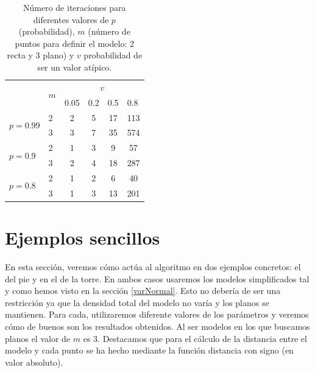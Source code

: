 \begin{table}[]
	\centering
	\begin{tabular}{l|l|c|c|c|c|}
		\cline{2-6}
		& \multirow{2}{*}{$ m $} & \multicolumn{4}{c|}{$ v $}                                                                                     \\ \cline{3-6} 
		&                    & \multicolumn{1}{l|}{0.05} & \multicolumn{1}{l|}{0.2} & \multicolumn{1}{l|}{0.5} & \multicolumn{1}{l|}{0.8} \\ \hline
		\multicolumn{1}{|l|}{\multirow{2}{*}{$ p = $0.99 }} & 2                  & 2                         & 5                        & 17                       & 113                      \\ \cline{2-6} 
		\multicolumn{1}{|l|}{}                          & 3                  & 3                         & 7                        & 35                       & 574                      \\ \hline
		\multicolumn{1}{|l|}{\multirow{2}{*}{$ p = $0.9 }}  & 2                  & 1                         & 3                        & 9                        & 57                       \\ \cline{2-6} 
		\multicolumn{1}{|l|}{}                          & 3                  & 2                         & 4                        & 18                       & 287                      \\ \hline
		\multicolumn{1}{|l|}{\multirow{2}{*}{$ p = $0.8 }}  & 2                  & 1                         & 2                        & 6                        & 40                       \\ \cline{2-6} 
		\multicolumn{1}{|l|}{}                          & 3                  & 1                         & 3                        & 13                       & 201                      \\ \hline
	\end{tabular}
\caption{Número de iteraciones para diferentes valores de $ p $ (probabilidad), $ m $ (número de puntos para definir el modelo: 2 recta y 3 plano) y $ v $ probabilidad de ser un valor atípico.}
\label{table:RANSAcvalues}
\end{table}


\section{Ejemplos sencillos}
En esta sección, veremos cómo actúa al algoritmo en dos ejemplos concretos: el del pie y en el de la torre. En ambos casos usaremos los modelos simplificados tal y como hemos visto en la sección \ref{varNormal}. Esto no debería de ser una restricción ya que la densidad total del modelo no varía y los planos se mantienen. Para cada, utilizaremos diferente valores de los parámetros y veremos cómo de buenos son los resultados obtenidos. Al ser modelos en los que buscamos planos el valor de $ m $ es 3. Destacamos que para el cálculo de la distancia entre el modelo y cada punto se ha hecho mediante la función distancia con signo (en valor absoluto).

